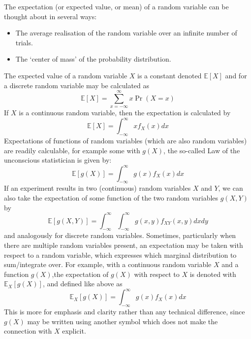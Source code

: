 \documentclass[11pt]{report} %
\begin{document}
The expectation (or expected value, or mean) of a random variable can be thought about in several ways:
\begin{itemize}
\item The average realisation of the random variable over an infinite number of trials.
\item The `center of mass' of the probability distribution.
\end{itemize}
The expected value of a random variable $X$ is a constant denoted $\mathbb{E}\left[X\right]$ and for a discrete random variable may be calculated as
\begin{equation}
\mathbb{E}\left[X\right] = \sum_{x = -\infty}^{\infty}x\operatorname{Pr}\left(X = x\right)
\end{equation}
If $X$ is a continuous random variable, then the expectation is calculated by
\begin{equation}
\mathbb{E}\left[X\right] = \int_{-\infty}^{\infty}xf_{X}\left(x\right)dx
\end{equation}
Expectations of functions of random variables (which are also random variables) are readily calculable, for example some with $g\left(X\right)$, the so-called Law of the unconscious statistician is given by:
\begin{equation}
\mathbb{E}\left[g\left(X\right)\right] = \int_{-\infty}^{\infty}g\left(x\right)f_{X}\left(x\right)dx
\end{equation}
If an experiment results in two (continuous) random variables $X$ and $Y$, we can also take the expectation of some function of the two random variables $g\left(X, Y\right)$ by
\begin{equation}
\mathbb{E}\left[g\left(X, Y\right)\right] = \int_{-\infty}^{\infty}\int_{-\infty}^{\infty}g\left(x, y\right)f_{XY}\left(x, y\right)dxdy
\end{equation}
and analogously for discrete random variables. Sometimes, particularly when there are multiple random variables present, an expectation may be taken with respect to a random variable, which expresses which marginal distribution to sum/integrate over. For example, with a continuous random variable $X$ and a function $g\left(X\right)$,the expectation of $g\left(X\right)$ with respect to $X$ is denoted with $\mathbb{E}_{X}\left[g\left(X\right)\right]$, and defined like above as
\begin{equation}
\mathbb{E}_{X}\left[g\left(X\right)\right] = \int_{-\infty}^{\infty}g\left(x\right)f_{X}\left(x\right)dx
\end{equation}
This is more for emphasis and clarity rather than any technical difference, since $g\left(X\right)$ may be written using another symbol which does not make the connection with $X$ explicit.
\end{document}
